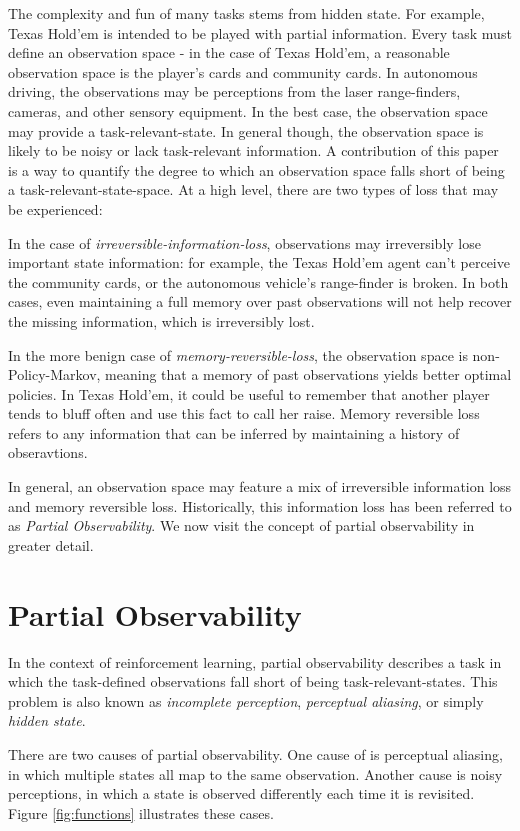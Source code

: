 \documentclass{article} %
\theoremstyle{definition}
\begin{document}
The complexity and fun of many tasks stems from hidden state. For
example, Texas Hold'em is intended to be played with partial
information. Every task must define an observation space - in the case
of Texas Hold'em, a reasonable observation space is the player's cards
and community cards. In autonomous driving, the observations may be
perceptions from the laser range-finders, cameras, and other sensory
equipment. In the best case, the observation space may provide a
task-relevant-state. In general though, the observation space is
likely to be noisy or lack task-relevant information. A contribution
of this paper is a way to quantify the degree to which an observation
space falls short of being a task-relevant-state-space. At a high
level, there are two types of loss that may be experienced:

In the case of \textit{irreversible-information-loss}, observations
may irreversibly lose important state information: for example, the
Texas Hold'em agent can't perceive the community cards, or the
autonomous vehicle's range-finder is broken. In both cases, even
maintaining a full memory over past observations will not help recover
the missing information, which is irreversibly lost.

In the more benign case of \textit{memory-reversible-loss}, the
observation space is non-Policy-Markov, meaning that a memory of past
observations yields better optimal policies. In Texas Hold'em, it
could be useful to remember that another player tends to bluff often
and use this fact to call her raise. Memory reversible loss refers to
any information that can be inferred by maintaining a history of
obseravtions.

In general, an observation space may feature a mix of irreversible
information loss and memory reversible loss. Historically, this
information loss has been referred to as \textit{Partial
  Observability}. We now visit the concept of partial observability in
greater detail.

\section{Partial Observability}
In the context of reinforcement learning, partial observability
describes a task in which the task-defined observations fall short of
being task-relevant-states. This problem is also known as
\textit{incomplete perception}, \textit{perceptual aliasing}, or
simply \textit{hidden state}.

There are two causes of partial observability. One cause of is
perceptual aliasing, in which multiple states all map to the same
observation. Another cause is noisy perceptions, in which a state is
observed differently each time it is revisited. Figure
\ref{fig:functions} illustrates these cases.
\end{document}
